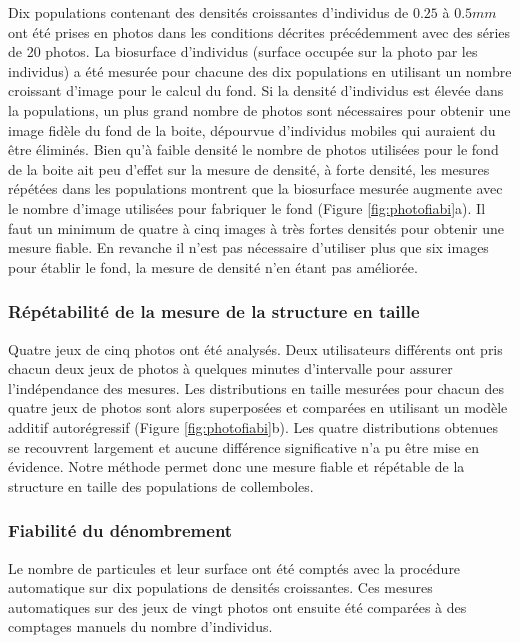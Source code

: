 Dix populations contenant des densités croissantes d'individus de $0.25$ à
$0.5mm$ ont été prises en photos dans les conditions décrites précédemment avec
des séries de 20 photos. La biosurface d'individus (surface occupée sur la photo
par les individus) a été mesurée pour chacune des dix populations en utilisant
un nombre croissant d'image pour le calcul du fond. Si la densité d'individus est
élevée dans la populations, un plus grand nombre de photos sont nécessaires pour
obtenir une image fidèle du fond de la boite, dépourvue d'individus mobiles qui
auraient du être éliminés. Bien qu'à faible densité le nombre de photos
utilisées pour le fond de la boite ait peu d'effet sur la mesure de densité, à forte
densité, les mesures répétées dans les populations montrent que la biosurface
mesurée augmente avec le nombre d'image utilisées pour fabriquer le fond
(Figure \ref{fig:photofiabi}a). Il faut un minimum de quatre à cinq images à
très fortes densités pour obtenir une mesure fiable. En revanche il n'est pas
nécessaire d'utiliser plus que six images pour établir le fond, la mesure
de densité n'en étant pas améliorée. 

\subsubsection{Répétabilité de la mesure de la structure en taille}

Quatre jeux de cinq photos ont été analysés. Deux utilisateurs différents ont
pris chacun deux jeux de photos à quelques minutes d'intervalle pour assurer
l'indépendance des mesures. Les distributions en taille mesurées pour chacun des
quatre jeux de photos sont alors superposées et comparées en utilisant un modèle
additif autorégressif (Figure \ref{fig:photofiabi}b). Les quatre distributions
obtenues se recouvrent largement et aucune différence significative n'a pu être
mise en évidence. Notre méthode permet donc une mesure fiable et répétable de la
structure en taille des populations de collemboles.

\subsubsection{Fiabilité du dénombrement}

Le nombre de particules et leur surface ont été comptés avec la procédure
automatique sur dix populations de densités croissantes. Ces mesures
automatiques sur des jeux de vingt photos ont ensuite été comparées à des comptages manuels
du nombre d'individus. 

